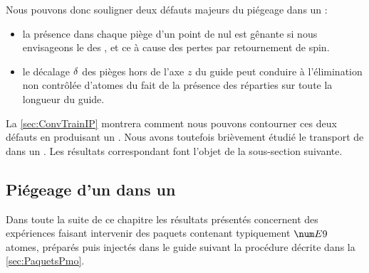 Nous pouvons donc souligner deux défauts majeurs du piégeage dans un \tpqp:
\begin{itemize}
	\item la présence dans chaque piège d'un point de \chm nul est gênante si nous envisageons le \rpe des \pats, et ce à cause des pertes par retournement de spin.
	\item le décalage ${\delta}$ des pièges hors de l'axe $z$ du guide peut conduire à l'élimination non contrôlée d'atomes du fait de la présence des \pdecs réparties sur toute la longueur du guide.
\end{itemize}
%
La \autoref{sec:ConvTrainIP} montrera comment nous pouvons contourner ces deux défauts en produisant un \tpIP.
Nous avons toutefois brièvement étudié le transport de \pats dans un \tpqp. Les résultats correspondant font l'objet de la sous-section suivante.


\casse


\subsection{Piégeage d'un \pat dans un \tpqp}
Dans toute la suite de ce chapitre les résultats présentés concernent des expériences faisant intervenir des paquets contenant typiquement $\val{E9}$ atomes, préparés puis injectés dans le guide suivant la procédure décrite dans la \autoref{sec:PaquetsPmo}. 

